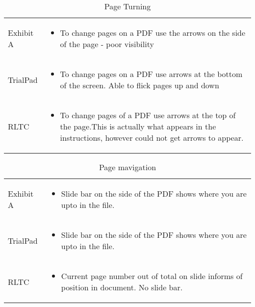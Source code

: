 \begin{center}
\begin{table}[h!]
\label{Table 1:}    
\caption{Page Turning}
\small
\centering
\begin{tabular}{|p{}|p{}|}
\hline
\rowcolor{lightgrey}\multicolumn{2}{|c|}{Page Turning}\\
\hline
Exhibit A & \begin{itemize}
    \item To change pages on a PDF use the arrows on the side of the page - poor visibility
\end{itemize}\\
\hline
TrialPad & \begin{itemize}
    \item To change pages on a PDF use arrows at the bottom of the screen. Able to flick pages up and down
\end{itemize}\\
\hline
RLTC & \begin{itemize}
    \item To change pages of a PDF use arrows at the top of the page.This is actually what appears in the instructions, however could not get arrows to appear.
 
\end{itemize}\\
\hline
\end{tabular}

\end{table}
\end{center}

\begin{center}
\begin{table}[h!]
\label{Table 2:}    
\caption{Page mavigation}
\centering
\begin{tabular}{|p{}|p{}|}

\rowcolor{lightgrey}\multicolumn{2}{|c|}{Page Navigation}\\
\hline
Exhibit A & \begin{itemize}
    \item Slide bar on the side of the PDF shows where you are upto in the file.
\end{itemize}\\
\hline
TrialPad & \begin{itemize}
    \item Slide bar on the side of the PDF shows where you are upto in the file.
\end{itemize}\\
\hline
RLTC & \begin{itemize}
    \item Current page number out of total on slide informs of position in document. No slide bar.
\end{itemize}\\
\hline
\end{tabular}


\end{table}
\end{center}



